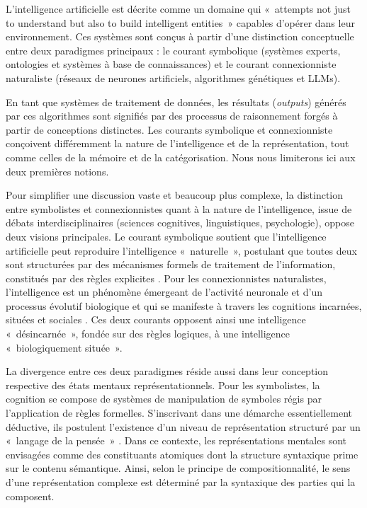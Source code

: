 \documentclass[fra, final]{anthology-ch}
\begin{document}
L’intelligence artificielle est décrite comme un domaine qui «~attempts not just to understand but also to build intelligent entities~» \cite{russell2009} capables d’opérer dans leur environnement. Ces systèmes sont conçus à partir d’une distinction conceptuelle entre deux paradigmes principaux : le courant symbolique (systèmes experts, ontologies et systèmes à base de connaissances) et le courant connexionniste naturaliste (réseaux de neurones artificiels, algorithmes génétiques et LLMs).

En tant que systèmes de traitement de données, les résultats (\textit{outputs}) générés par ces algorithmes sont signifiés par des processus de raisonnement forgés à partir de conceptions distinctes. Les courants symbolique et connexionniste conçoivent différemment la nature de l’intelligence et de la représentation, tout comme celles de la mémoire et de la catégorisation. Nous nous limiterons ici aux deux premières notions.

Pour simplifier une discussion vaste et beaucoup plus complexe, la distinction entre symbolistes et connexionnistes quant à la nature de l’intelligence, issue de débats interdisciplinaires (sciences cognitives, linguistiques, psychologie), oppose deux visions principales. Le courant symbolique soutient que l’intelligence artificielle peut reproduire l’intelligence «~naturelle~», postulant que toutes deux sont structurées par des mécanismes formels de traitement de l’information, constitués par des règles explicites \cite{turing1950, minsky1972, fodor1988}. Pour les connexionnistes naturalistes, l’intelligence est un phénomène émergeant de l’activité neuronale et d’un processus évolutif biologique et qui se manifeste à travers les cognitions incarnées, situées et sociales \cite{rumelhart1986, varela1991, evans1993}. Ces deux courants opposent ainsi une intelligence «~désincarnée~», fondée sur des règles logiques, à une intelligence «~biologiquement située~».

La divergence entre ces deux paradigmes réside aussi dans leur conception respective des états mentaux représentationnels. Pour les symbolistes, la cognition se compose de systèmes de manipulation de symboles régis par l'application de règles formelles. S'inscrivant dans une démarche essentiellement déductive, ils postulent l'existence d'un niveau de représentation structuré par un «~langage de la pensée~» \cite{fodor1988}. Dans ce contexte, les représentations mentales sont envisagées comme des constituants atomiques dont la structure syntaxique prime sur le contenu sémantique. Ainsi, selon le principe de compositionnalité, le sens d’une représentation complexe est déterminé par la syntaxique des parties qui la composent.
\end{document}
